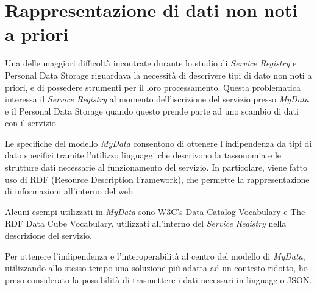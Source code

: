 \section{Rappresentazione di dati non noti a priori}
Una delle maggiori difficolt\`a incontrate durante lo studio di \textit{Service Registry} e Personal Data Storage riguardava la necessit\`a di descrivere tipi di dato non noti a priori, e di possedere strumenti per il loro processamento. Questa problematica interessa il \textit{Service Registry} al momento dell’iscrizione del servizio presso \textit{MyData} e il Personal Data Storage quando questo prende parte ad uno scambio di dati con il servizio.

Le specifiche del modello \textit{MyData} consentono di ottenere l’indipendenza da tipi di dato specifici tramite l’utilizzo linguaggi che descrivono la tassonomia e le strutture dati necessarie al funzionamento del servizio. In particolare, viene fatto uso di RDF (Resource Description Framework), che permette la rappresentazione di informazioni all’interno del web \cite{w3crdf}.

Alcuni esempi utilizzati in \textit{MyData} sono W3C’s Data Catalog Vocabulary\cite{w3cdatacatalog} e The RDF Data Cube Vocabulary\cite{w3cdatacube}, utilizzati all’interno del \textit{Service Registry} nella descrizione del servizio.

Per ottenere l’indipendenza e l’interoperabilit\`a al centro del modello di \textit{MyData}, utilizzando allo stesso tempo una soluzione pi\`u adatta ad un contesto ridotto, ho preso considerato la possibilit\`a di trasmettere i dati necessari in linguaggio JSON.


